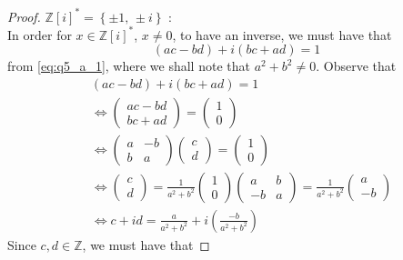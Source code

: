 \begin{eg}
\begin{proof}
    \textbf{$\mathbb{Z}[i]^* = \left\{ \pm 1, \, \pm i \right\}$} : \\
    In order for $x \in \mathbb{Z}[i]^*$, $x \neq 0$, to have an inverse, we must have that
      \begin{equation*}
        (ac - bd) + i ( bc + ad ) = 1
      \end{equation*}
      from \cref{eq:q5_a_1}, where we shall note that $a^2 + b^2 \neq 0$. Observe that
      \begin{align*}
        &( ac - bd ) + i ( bc + ad ) = 1 \\
        &\iff \begin{pmatrix}
            ac - bd \\ bc + ad 
        \end{pmatrix} = \begin{pmatrix}
              1 \\ 0
        \end{pmatrix} \\
        &\iff \begin{pmatrix}
            a & -b \\ b & a
        \end{pmatrix} \begin{pmatrix}
          c \\ d
        \end{pmatrix} = \begin{pmatrix}
          1 \\ 0
        \end{pmatrix} \\
        &\iff \begin{pmatrix}
          c \\ d
        \end{pmatrix} = \frac{1}{a^2 + b^2} \begin{pmatrix}
          1 \\ 0
        \end{pmatrix} \begin{pmatrix}
          a & b \\ -b & a
        \end{pmatrix} = \frac{1}{a^2 + b^2} \begin{pmatrix}
          a \\ -b
        \end{pmatrix} \\
        &\iff c + id = \frac{a}{a^2 + b^2} + i \left( \frac{-b}{a^2 + b^2} \right)
      \end{align*}
      Since $c, d \in \mathbb{Z}$, we must have that

\end{proof}
\end{eg}
